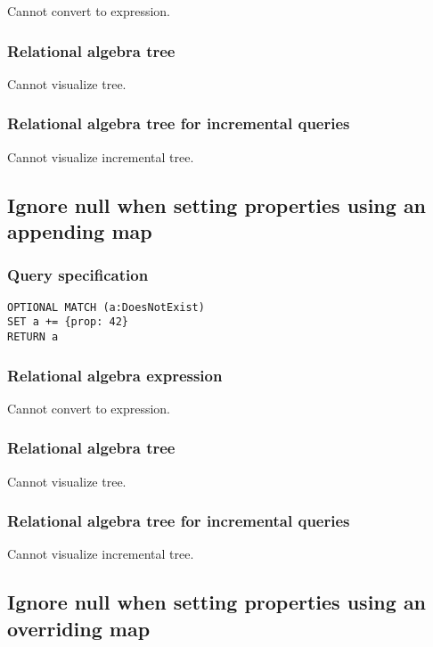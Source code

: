 Cannot convert to expression.

\subsubsection*{Relational algebra tree}

Cannot visualize tree.

\subsubsection*{Relational algebra tree for incremental queries}

Cannot visualize incremental tree.

\subsection{Ignore null when setting properties using an appending map}

\subsubsection*{Query specification}

\begin{lstlisting}
OPTIONAL MATCH (a:DoesNotExist)
SET a += {prop: 42}
RETURN a
\end{lstlisting}

\subsubsection*{Relational algebra expression}

Cannot convert to expression.

\subsubsection*{Relational algebra tree}

Cannot visualize tree.

\subsubsection*{Relational algebra tree for incremental queries}

Cannot visualize incremental tree.

\subsection{Ignore null when setting properties using an overriding map}

